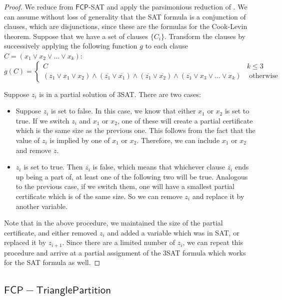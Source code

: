 \documentclass[runningheads,a4paper]{llncs}
\begin{document}
\begin{proof}
We reduce from $\mathsf{FCP}$-SAT and apply the parsimonious reduction of \cite{yaleclass}. We can assume without loss of generality that the SAT formula is a conjunction of clauses, which are disjunctions, since these are the formulas for the Cook-Levin theorem. Suppose that we have a set of clauses $\{ C_i \}$. Transform the clauses by successively applying the following function $g$ to each clause $C = (x_1 \vee x_2 \vee ... \vee x_k)$:
\[ g(C) = \left\{ \begin{array}{cc} C & k \leq 3 \\
						    (z_1 \vee x_1 \vee x_2) \wedge (\overline{z_1} \vee \overline{x_1}) \wedge (\overline{z_1} \vee \overline{x_2}) \wedge (\overline{z_1} \vee x_3 \vee ... \vee x_k) & \text{ otherwise }\end{array} \right. \] 

Suppose $z_i$ is in a partial solution of 3SAT. There are two cases:
\begin{itemize}
\item Suppose $z_i$ is set to false. In this case, we know that either $x_1$ or $x_2$ is set to true. If we switch $z_i$ and $x_1$ or $x_2$, one of these will create a partial certificate which is the same size as the previous one. This follows from the fact that the value of $z_i$ is implied by one of $x_1$ or $x_2$. Therefore, we can include $x_1$ or $x_2$ and remove $z$.
\item $z_i$ is set to true. Then $\overline{z_i}$ is false, which means that whichever clause $\overline{z_i}$ ends up being a part of, at least one of the following two will be true. Analogous to the previous case, if we switch them, one will have a smallest partial certificate which is of the same size. So we can remove $z_i$ and replace it by another variable. 
\end{itemize}
Note that in the above procedure, we maintained the size of the partial certificate, and either removed $z_i$ and added a variable which was in SAT, or replaced it by $z_{i+1}$. Since there are a limited number of $z_i$, we can repeat this procedure and arrive at a partial assignment of the 3SAT formula which works for the SAT formula as well.
\end{proof}

\subsection{$\mathsf{FCP-Triangle Partition}$}
\end{document}
